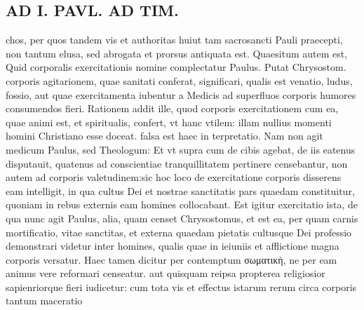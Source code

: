 \documentclass{article}
\begin{document}
\begin{pages}
\section*{AD I. PAVL. AD TIM. }
\marginpar{[ p.208 ]}\pstart chos, per quos tandem vis et authoritas huiut tam sacrosancti Pauli praecepti, non tantum elusa, sed abrogata et prorsus antiquata est. Quaesitum autem est, Quid corporalis exercitationis nomine complectatur Paulus. Putat Chrysostom. corporis agitarionem, quae sanitati conferat, significari, qualis est venatio, ludus, fossio, aut quae exercitamenta iubentur a Medicis ad superfluos corporis humores consumendos fieri. Rationem addit ille, quod corporis exercitationem cum ea, quae animi est, et spiritualis, confert, vt hanc vtilem: illam nullius momenti homini Christiano esse doceat. falsa est haec in terpretatio. Nam non agit medicum Paulus, sed Theologum: Et vt supra cum de cibis agebat, de iis eatenus disputauit, quatenus ad conscientiae tranquillitatem pertinere censebantur, non autem ad corporis valetudinem:sic hoc loco de exercitatione corporis disserens eam intelligit, in qua cultus Dei et nostrae sanctitatis pars quaedam constituitur, quoniam in rebus externis eam homines collocabant. Est igitur exercitatio ista, de qua nunc agit Paulus, alia, quam censet Chrysostomus, et est ea, per quam carnis mortificatio, vitae sanctitas, et externa quaedam pietatis cultusque Dei professio demonstrari videtur inter homines, qualis quae in ieiuniis et afflictione magna corporis versatur. Haec tamen dicitur per contemptum σωματικὴ, ne per eam animus vere reformari censeatur. aut quisquam reipsa propterea religiosior sapienriorque fieri iudicetur: cum tota vis et effectus istarum rerum circa corporis tantum maceratio\pend

\end{pages}
\end{document}
